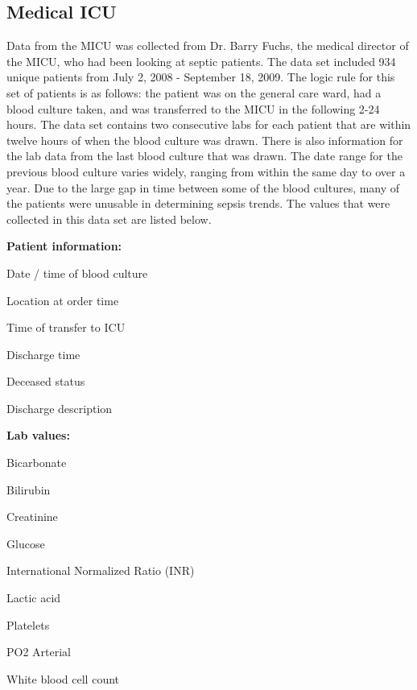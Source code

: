 \documentclass{sig-alternate}
\begin{document}
\vspace{10pt}
\subsection{Medical ICU}
\label{subsec:micu}
\vspace{10pt}

Data from the MICU was collected from Dr. Barry Fuchs, the medical director of the MICU, who had been looking at septic patients.  The data set included 934 unique patients from July 2, 2008 - September 18, 2009.  The logic rule for this set of patients is as follows: the patient was on the general care ward, had a blood culture taken, and was transferred to the MICU in the following 2-24 hours.  The data set contains two consecutive labs for each patient that are within twelve hours of when the blood culture was drawn.  There is also information for the lab data from the last blood culture that was drawn.  The date range for the previous blood culture varies widely, ranging from within the same day to over a year.  Due to the large gap in time between some of the blood cultures, many of the patients were unusable in determining sepsis trends.  The values that were collected in this data set are listed below.
\linebreak

\noindent \textbf{Patient information:}
\begin{itemize*}
  \item Date / time of blood culture
  \item Location at order time
  \item Time of transfer to ICU
  \item Discharge time
  \item Deceased status
  \item Discharge description
\end{itemize*}

\noindent \textbf{Lab values:}
\begin{itemize*}
  \item Bicarbonate
  \item Bilirubin
  \item Creatinine
  \item Glucose
  \item International Normalized Ratio (INR)
  \item Lactic acid
  \item Platelets
  \item PO2 Arterial
  \item White blood cell count
\end{itemize*}
\end{document}
